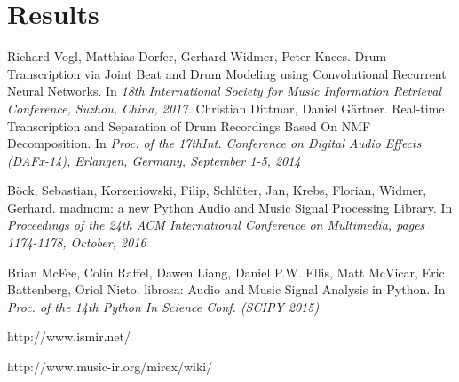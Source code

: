 \documentclass[10pt]{article}
\begin{document}
\section{Results}
\begin{thebibliography}{9}
Richard Vogl, Matthias Dorfer, Gerhard Widmer, Peter Knees.  
Drum Transcription via Joint Beat and Drum Modeling using Convolutional Recurrent Neural Networks. In
\textit{18th International Society for Music Information Retrieval Conference, Suzhou, China, 2017.}
Christian Dittmar, Daniel Gärtner.
Real-time Transcription and Separation of Drum Recordings Based On NMF Decomposition. In
\textit{Proc. of the 17thInt. Conference on Digital Audio Effects (DAFx-14), Erlangen, Germany, September 1-5, 2014}

 {B{\"o}ck, Sebastian, Korzeniowski, Filip, Schl{\"u}ter, Jan, Krebs, Florian, Widmer, Gerhard}.
 madmom: a new Python Audio and Music Signal Processing Library. In
\textit{Proceedings of the 24th ACM International Conference on
   Multimedia, pages 1174-1178, October, 2016}
   
Brian McFee, Colin Raffel, Dawen Liang, Daniel P.W. Ellis, Matt McVicar, Eric Battenberg, Oriol Nieto. 
librosa: Audio and Music Signal Analysis in Python. In
\textit{Proc. of the 14th Python In Science Conf. (SCIPY 2015)}

http://www.ismir.net/

http://www.music-ir.org/mirex/wiki/

\end{thebibliography}
\end{document}
